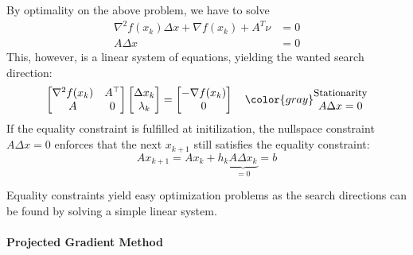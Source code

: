 By optimality on the above problem, we have to solve
\begin{align*}
    \nabla^2 f(x_k) \Delta x + \nabla f(x_k) + A^T \nu & = 0 \\
    A \Delta x                                         & = 0
\end{align*}
This, however, is a linear system of equations, yielding the wanted search direction:
\begin{equation*}
    \begin{bmatrix}
        \nabla^2 f(x_k) & A^\top \\
        A               & 0
    \end{bmatrix}\begin{bmatrix}
        \Delta x_k \\
        \lambda_k
    \end{bmatrix}
    = \begin{bmatrix}
        -\nabla f(x_k) \\
        0
    \end{bmatrix} \quad {\color{gray}\begin{matrix}
            \text{\small{Stationarity}} \\
            A\Delta x = 0
        \end{matrix}}
\end{equation*}
\newpar{}
If the equality constraint is fulfilled at initilization, the nullspace constraint $A\Delta x = 0$ enforces that the next $x_{k+1}$ still satisfies the equality constraint:
\begin{equation*}
    Ax_{k+1} = Ax_k + h_k \underbrace{A\Delta x_k}_{=0} = b
\end{equation*}

\newpar{}

Equality constraints yield easy optimization problems as the search directions can be found by solving a simple linear system.

\paragraph{Projected Gradient Method}

